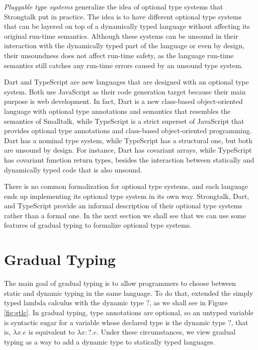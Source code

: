 \emph{Pluggable type systems} \citep{bracha2004pluggable} generalize
the idea of optional type systems that Strongtalk put in practice.
The idea is to have different optional type systems that can be layered
on top of a dynamically typed language without affecting its original
run-time semantics.
Although these systems can be unsound in their interaction with the
dynamically typed part of the language or even by design, their
unsoundness does not affect run-time safety, as the language run-time
semantics still catches any run-time errors caused by an unsound
type system.

Dart \citep{dart} and TypeScript \citep{typescript} are new
languages that are designed with an optional type system.
Both use JavaScript as their code generation target because
their main purpose is web development.
In fact, Dart is a new class-based object-oriented language with
optional type annotations and semantics that resembles the
semantics of Smalltalk, while TypeScript is a strict superset of
JavaScript that provides optional type annotations and class-based
object-oriented programming.
Dart has a nominal type system, while TypeScript has a structural
one, but both are unsound by design.
For instance, Dart has covariant arrays, while TypeScript has
covariant function return types,
besides the interaction between statically and dynamically
typed code that is also unsound.

There is no common formalization for optional type systems, and
each language ends up implementing its optional type system in
its own way.
Strongtalk, Dart, and TypeScript provide an informal description of
their optional type systems rather than a formal one.
In the next section we shall see that we can use some features
of gradual typing \citep{siek2006gradual,siek2007objects} to
formalize optional type systems.

\section{Gradual Typing}
\label{sec:gradual}

The main goal of gradual typing \citep{siek2006gradual} is to allow
programmers to choose between static and dynamic typing in the same
language.
To do that, \citet{siek2006gradual} extended the simply typed
lambda calculus with the dynamic type $?$, as we shall see in
Figure \ref{fig:gtlc}.
In gradual typing, type annotations are optional, so an untyped
variable is syntactic sugar for a variable whose declared type is
the dynamic type $?$, that is, $\lambda x.e$ is equivalent to $\lambda x{:}?.e$.
Under these circumstances, we view gradual typing as a way to add
a dynamic type to statically typed languages.

